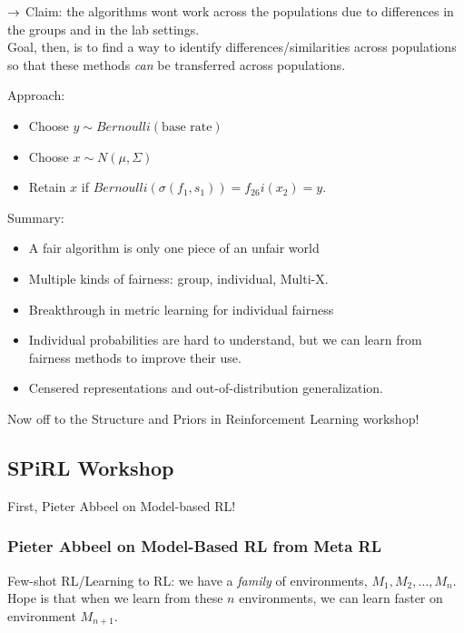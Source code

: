 $\rightarrow$ Claim: the algorithms wont work across the populations due to differences in the groups and in the lab settings. \\

Goal, then, is to find a way to identify differences/similarities across populations so that these methods {\it can} be transferred across populations.

Approach:
\begin{itemize}
    \item Choose $y \sim Bernoulli(\text{base rate})$
    \item Choose $x \sim N(\mu, \Sigma)$
    \item Retain $x$ if $Bernoulli(\sigma(f_1,s_1)) = f_26i(x_2) = y$.
\end{itemize}


Summary:
\begin{itemize}
    \item A fair algorithm is only one piece of an unfair world
    \item Multiple kinds of fairness: group, individual, Multi-X.
    \item Breakthrough in metric learning for individual fairness
    \item Individual probabilities are hard to understand, but we can  learn from fairness methods to improve their use.
    \item Censered representations and out-of-distribution generalization.
\end{itemize}

\spacerule


Now off to the Structure and Priors in Reinforcement Learning workshop!


\subsection{SPiRL Workshop}

First, Pieter Abbeel on Model-based RL!

\subsubsection{Pieter Abbeel on Model-Based RL from Meta RL}

Few-shot RL/Learning to RL: we have a {\it family} of environments, $M_1, M_2, \ldots, M_n$. Hope is that when we learn from these $n$ environments, we can learn faster on environment $M_{n+1}$. \\

